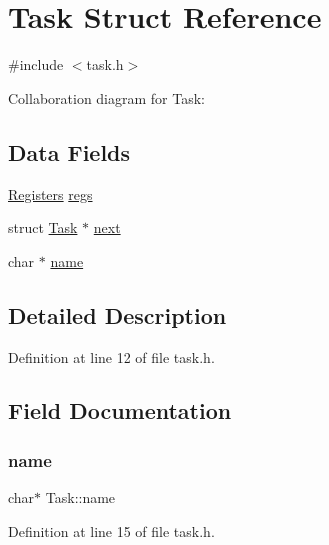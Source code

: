 \hypertarget{a00136}{}\section{Task Struct Reference}
\label{a00136}


{\ttfamily \#include $<$task.\+h$>$}



Collaboration diagram for Task\+:
\subsection*{Data Fields}
\begin{DoxyCompactItemize}
\item 
\hyperlink{a00132}{Registers} \hyperlink{a00136_a136b243ee52ff89e9ba97f4e4dba19bb_a136b243ee52ff89e9ba97f4e4dba19bb}{regs}
\item 
struct \hyperlink{a00136}{Task} $\ast$ \hyperlink{a00136_a8b6b50960a19f7bae344ef0cc8ec4e7d_a8b6b50960a19f7bae344ef0cc8ec4e7d}{next}
\item 
char $\ast$ \hyperlink{a00136_a9cf84d1792cda878178fd3691e472b97_a9cf84d1792cda878178fd3691e472b97}{name}
\end{DoxyCompactItemize}


\subsection{Detailed Description}


Definition at line 12 of file task.\+h.



\subsection{Field Documentation}
\mbox{\label{a00136_a9cf84d1792cda878178fd3691e472b97_a9cf84d1792cda878178fd3691e472b97}} 
\subsubsection{\texorpdfstring{name}{name}}
{\footnotesize\ttfamily char$\ast$ Task\+::name}



Definition at line 15 of file task.\+h.

\mbox{\label{a00136_a8b6b50960a19f7bae344ef0cc8ec4e7d_a8b6b50960a19f7bae344ef0cc8ec4e7d}} 
